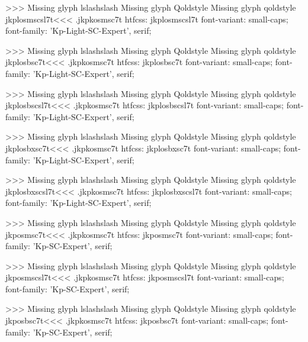 >>>
Missing glyph	lslashslash
Missing glyph	Qoldstyle
Missing glyph	qoldstyle
\<jkplosmscsl7t\><<<
.jkpkosmsc7t
htfcss:  jkplosmscsl7t  font-variant: small-caps; font-family: 'Kp-Light-SC-Expert', serif;

>>>
Missing glyph	lslashslash
Missing glyph	Qoldstyle
Missing glyph	qoldstyle
\<jkplosbsc7t\><<<
.jkpkosmsc7t
htfcss:  jkplosbsc7t  font-variant: small-caps; font-family: 'Kp-Light-SC-Expert', serif;

>>>
Missing glyph	lslashslash
Missing glyph	Qoldstyle
Missing glyph	qoldstyle
\<jkplosbscsl7t\><<<
.jkpkosmsc7t
htfcss:  jkplosbscsl7t  font-variant: small-caps; font-family: 'Kp-Light-SC-Expert', serif;

>>>
Missing glyph	lslashslash
Missing glyph	Qoldstyle
Missing glyph	qoldstyle
\<jkplosbxsc7t\><<<
.jkpkosmsc7t
htfcss:  jkplosbxsc7t  font-variant: small-caps; font-family: 'Kp-Light-SC-Expert', serif;

>>>
Missing glyph	lslashslash
Missing glyph	Qoldstyle
Missing glyph	qoldstyle
\<jkplosbxscsl7t\><<<
.jkpkosmsc7t
htfcss:  jkplosbxscsl7t  font-variant: small-caps; font-family: 'Kp-Light-SC-Expert', serif;

>>>
Missing glyph	lslashslash
Missing glyph	Qoldstyle
Missing glyph	qoldstyle
\<jkposmsc7t\><<<
.jkpkosmsc7t
htfcss:  jkposmsc7t  font-variant: small-caps; font-family: 'Kp-SC-Expert', serif;

>>>
Missing glyph	lslashslash
Missing glyph	Qoldstyle
Missing glyph	qoldstyle
\<jkposmscsl7t\><<<
.jkpkosmsc7t
htfcss:  jkposmscsl7t  font-variant: small-caps; font-family: 'Kp-SC-Expert', serif;

>>>
Missing glyph	lslashslash
Missing glyph	Qoldstyle
Missing glyph	qoldstyle
\<jkposbsc7t\><<<
.jkpkosmsc7t
htfcss:  jkposbsc7t  font-variant: small-caps; font-family: 'Kp-SC-Expert', serif;

